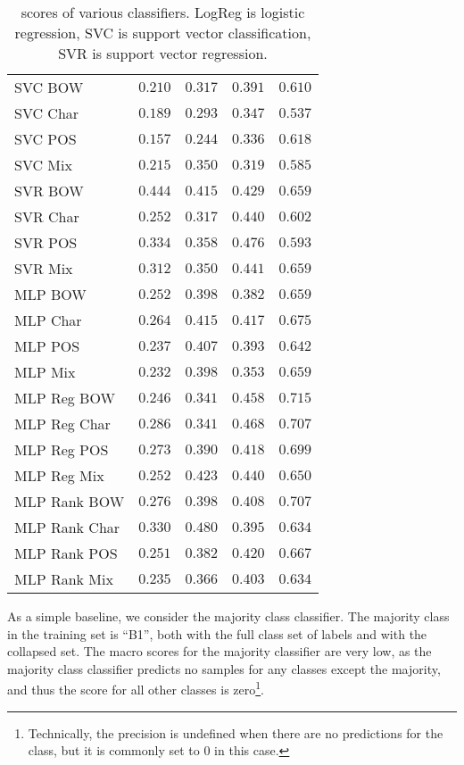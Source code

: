 \begin{table}
\begin{tabular}{lrrrr}
    \midrule
    SVC BOW & $0.210$ & $0.317$ & $0.391$ & $0.610$ \\
    SVC Char & $0.189$ & $0.293$ & $0.347$ & $0.537$ \\
    SVC POS & $0.157$ & $0.244$ & $0.336$ & $0.618$ \\
    SVC Mix & $0.215$ & $0.350$ & $0.319$ & $0.585$ \\
    \midrule
    SVR BOW & $\mathbf{0.444}$ & $0.415$ & $0.429$ & $0.659$ \\
    SVR Char & $0.252$ & $0.317$ & $0.440$ & $0.602$ \\
    SVR POS & $0.334$ & $0.358$ & $\mathbf{0.476}$ & $0.593$ \\
    SVR Mix & $0.312$ & $0.350$ & $0.441$ & $0.659$ \\
    \midrule
    MLP BOW & $0.252$ & $0.398$ & $0.382$ & $0.659$ \\
    MLP Char & $0.264$ & $0.415$ & $0.417$ & $0.675$ \\
    MLP POS & $0.237$ & $0.407$ & $0.393$ & $0.642$ \\
    MLP Mix & $0.232$ & $0.398$ & $0.353$ & $0.659$ \\
    \midrule
    MLP Reg BOW & $0.246$ & $0.341$ & $0.458$ & $\mathbf{0.715}$ \\
    MLP Reg Char & $0.286$ & $0.341$ & $0.468$ & $0.707$ \\
    MLP Reg POS & $0.273$ & $0.390$ & $0.418$ & $0.699$ \\
    MLP Reg Mix & $0.252$ & $0.423$ & $0.440$ & $0.650$ \\
    \midrule
    MLP Rank BOW & $0.276$ & $0.398$ & $0.408$ & $0.707$ \\
    MLP Rank Char & $0.330$ & $\mathbf{0.480}$ & $0.395$ & $0.634$ \\
    MLP Rank POS & $0.251$ & $0.382$ & $0.420$ & $0.667$ \\
    MLP Rank Mix & $0.235$ & $0.366$ & $0.403$ & $0.634$ \\
    \bottomrule
  \end{tabular}
  \caption[\FI scores of linear and neural classifiers]{
    \FI scores of various classifiers. LogReg is logistic regression, SVC is
    support vector classification, SVR is support vector regression.
  }
  \label{tab:baseline-accuracies}
\end{table}

As a simple baseline, we consider the majority class classifier. The majority
class in the training set is ``B1'', both with the full class set of labels
and with the collapsed set. The macro \FI scores for the majority classifier
are very low, as the majority class classifier predicts no samples for any
classes except the majority, and thus the \FI score for all other classes is
zero\footnote{Technically, the precision is undefined when there are no
predictions for the class, but it is commonly set to 0 in this case.}.


